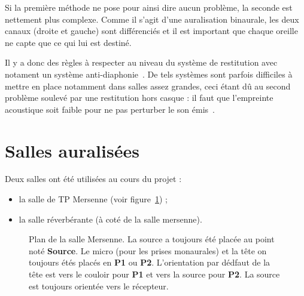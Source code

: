 Si la première méthode ne pose pour ainsi dire aucun problème, la seconde est nettement plus complexe.
Comme il s'agit d'une auralisation binaurale, les deux canaux (droite et gauche) sont différenciés et il est important
que chaque oreille ne capte que ce qui lui est destiné.

Il y a donc des règles à respecter au niveau du système de restitution avec notament un système
anti-diaphonie~\cite{Kle93}. De tels systèmes sont parfois difficiles à mettre en place notamment dans salles assez
grandes, ceci étant dû au second problème soulevé par une restitution hors casque : il faut que l'empreinte acoustique
soit faible pour ne pas perturber le son émis~\cite{Bru10}.

\section{Salles auralisées} %

Deux salles ont été utilisées au cours du projet :

\begin{itemize}
    \item la salle de TP Mersenne (voir figure~\ref{plan_mersenne}) ;
    \item la salle réverbérante (à coté de la salle mersenne).
\end{itemize}

\begin{figure}[h!]
    \caption{\label{plan_mersenne}Plan de la salle Mersenne. La source a toujours été placée au point noté
    \textbf{Source}. Le micro (pour les prises monaurales) et la tête on toujours étés placés en \textbf{P1} ou
    \textbf{P2}. L'orientation par dédfaut de la tête est vers le couloir pour \textbf{P1} et vers la source pour
    \textbf{P2}. La source est toujours orientée vers le récepteur.}
\end{figure}
